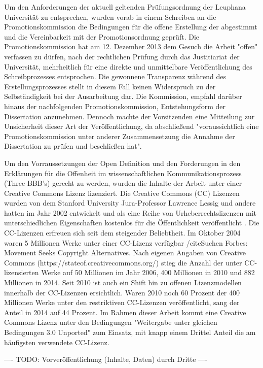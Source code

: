 Um den Anforderungen der aktuell geltenden Prüfungsordnung der Leuphana Universität zu entsprechen, wurden vorab in einem Schreiben an die Promotionskommission die Bedingungen für die offene Erstellung der abgestimmt und die Vereinbarkeit mit der Promotionsordnung geprüft. Die Promotionskommission hat am 12. Dezember 2013 dem Gesuch die Arbeit "offen" verfassen zu dürfen, nach der rechtlichen Prüfung durch das Justitiariat der Universität, mehrheitlich für eine direkte und unmittelbare Veröffentlichung des Schreibprozesses entsprochen. Die gewonnene Transparenz während des Erstellungsprozesses stellt in diesem Fall keinen Widerspruch zu der Selbständigkeit bei der Ausarbeitung dar. Die Kommission, empfahl darüber hinaus der nachfolgenden Promotionskommission, Entstehungsform der Dissertation anzunehmen. Dennoch machte der Vorsitzenden eine Mitteilung zur Unsicherheit dieser Art der Veröffentlichung, da abschließend "voraussichtlich eine Promotionskommission unter anderer Zusammensetzung die Annahme der Dissertation zu prüfen und beschließen hat".

Um den Vorraussetzungen der Open Definition und den Forderungen in den Erklärungen für die Offenheit im wissenschaftlichen Kommunikationsprozess (Three BBB's) gerecht zu werden, wurden die Inhalte der Arbeit unter einer Creative Commons Lizenz lizenziert. Die Creative Commons (CC) Lizenzen wurden von dem Stanford University Jura-Professor Lawrence Lessig und andere hatten im Jahr 2002 entwickelt und als eine Reihe von Urheberrechtslizenzen mit unterschiedlichen Eigenschaften kostenlos für die Öffentlichkeit veröffentlicht \cite{Minjeong_2007}. Die CC-Lizenzen erfreuen sich seit dem steigender Beliebtheit. Im Oktober 2004 waren 5 Millionen Werke unter einer CC-Lizenz verfügbar /cite{Suchen Forbes: Movement Seeks Copyright Alternatives}. Nach eigenen Angaben von Creative Commons (https://stateof.creativecommons.org/) stieg die Anzahl der unter CC-lizensierten Werke auf 50 Millionen im Jahr 2006, 400 Millionen in 2010 und 882 Millionen in 2014. Seit 2010 ist auch ein Shift hin zu offenen Lizenzmodellen innerhalb der CC-Lizenzen ersichtlich. Waren 2010 noch 60 Prozent der 400 Millionen Werke unter den restriktiven CC-Lizenzen veröffentlicht, sang der Anteil in 2014 auf 44 Prozent. Im Rahmen dieser Arbeit kommt eine Creative Commons Lizenz unter den Bedingungen "Weitergabe unter gleichen Bedingungen 3.0 Unported" zum Einsatz, mit knapp einem Drittel Anteil die am häufigsten verwendete CC-Lizenz.

---- TODO: Vorveröffentlichung (Inhalte, Daten) durch Dritte ----

